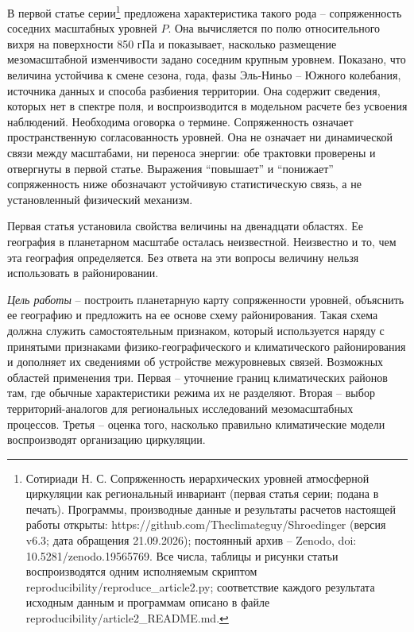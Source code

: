 \documentclass[12pt,a4paper]{article}
\begin{document}
В первой статье серии\footnote{Сотириади Н. С. Сопряженность иерархических уровней атмосферной циркуляции как региональный инвариант (первая статья серии; подана в печать). Программы, производные данные и результаты расчетов настоящей работы открыты: https://github.com/Theclimateguy/Shroedinger (версия v6.3; дата обращения 21.09.2026); постоянный архив -- Zenodo, doi: 10.5281/zenodo.19565769. Все числа, таблицы и рисунки статьи воспроизводятся одним исполняемым скриптом reproducibility/reproduce\_article2.py; соответствие каждого результата исходным данным и программам описано в файле reproducibility/article2\_README.md.} предложена характеристика такого рода -- сопряженность соседних масштабных уровней $P$. Она вычисляется по полю относительного вихря на поверхности 850 гПа и показывает, насколько размещение мезомасштабной изменчивости задано соседним крупным уровнем. Показано, что величина устойчива к смене сезона, года, фазы Эль-Ниньо -- Южного колебания, источника данных \cite{Gelaro2017} и способа разбиения территории. Она содержит сведения, которых нет в спектре поля, и воспроизводится в модельном расчете без усвоения наблюдений. Необходима оговорка о термине. Сопряженность означает пространственную согласованность уровней. Она не означает ни динамической связи между масштабами, ни переноса энергии: обе трактовки проверены и отвергнуты в первой статье. Выражения “повышает” и “понижает” сопряженность ниже обозначают устойчивую статистическую связь, а не установленный физический механизм.

Первая статья установила свойства величины на двенадцати областях. Ее география в планетарном масштабе осталась неизвестной. Неизвестно и то, чем эта география определяется. Без ответа на эти вопросы величину нельзя использовать в районировании.

\emph{Цель работы} -- построить планетарную карту сопряженности уровней, объяснить ее географию и предложить на ее основе схему районирования. Такая схема должна служить самостоятельным признаком, который используется наряду с принятыми признаками физико-географического и климатического районирования \cite{Isachenko1991} и дополняет их сведениями об устройстве межуровневых связей. Возможных областей применения три. Первая -- уточнение границ климатических районов там, где обычные характеристики режима их не разделяют. Вторая -- выбор территорий-аналогов для региональных исследований мезомасштабных процессов. Третья -- оценка того, насколько правильно климатические модели воспроизводят организацию циркуляции.
\end{document}
